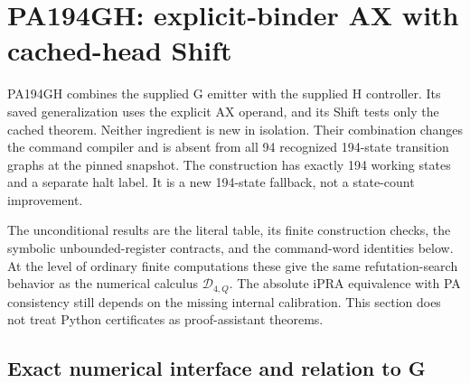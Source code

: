 \section{PA194GH: explicit-binder AX with cached-head Shift}
\label{sec:pa194gh-new}

PA194GH combines the supplied G emitter with the supplied H controller.
Its saved generalization uses the explicit AX operand, and its Shift
tests only the cached theorem. Neither ingredient is new in isolation.
Their combination changes the command compiler and is absent from all
94 recognized 194-state transition graphs at the pinned snapshot.
The construction has exactly 194 working states and a separate halt label.
It is a new 194-state fallback, not a state-count improvement.

The unconditional results are the literal table, its finite construction
checks, the symbolic unbounded-register contracts, and the command-word
identities below. At the level of ordinary finite computations these give
the same refutation-search behavior as the numerical calculus
$\mathcal D_{4,Q}$. The absolute iPRA equivalence with PA consistency
still depends on the missing internal calibration. This section does not
treat Python certificates as proof-assistant theorems.

\subsection{Exact numerical interface and relation to G}

